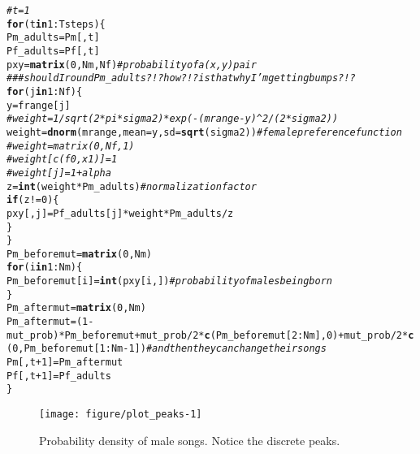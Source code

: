 \documentclass{article}\usepackage[]{graphicx}\usepackage[]{color}
\makeatletter
\def\maxwidth{ %
  \ifdim\Gin@nat@width>\linewidth
    \linewidth
  \else
    \Gin@nat@width
  \fi
}
\newcommand{\hlnum}[1]{\textcolor[rgb]{0.686,0.059,0.569}{#1}}%
\newcommand{\hlcom}[1]{\textcolor[rgb]{0.678,0.584,0.686}{\textit{#1}}}%
\newcommand{\hlopt}[1]{\textcolor[rgb]{0,0,0}{#1}}%
\newcommand{\hlstd}[1]{\textcolor[rgb]{0.345,0.345,0.345}{#1}}%
\newcommand{\hlkwa}[1]{\textcolor[rgb]{0.161,0.373,0.58}{\textbf{#1}}}%
\newcommand{\hlkwb}[1]{\textcolor[rgb]{0.69,0.353,0.396}{#1}}%
\newcommand{\hlkwc}[1]{\textcolor[rgb]{0.333,0.667,0.333}{#1}}%
\newcommand{\hlkwd}[1]{\textcolor[rgb]{0.737,0.353,0.396}{\textbf{#1}}}%
\newenvironment{kframe}{%
 \def\at@end@of@kframe{}%
 \ifinner\ifhmode%
  \def\at@end@of@kframe{\end{minipage}}%
  \begin{minipage}{\columnwidth}%
 \fi\fi%
 \def\FrameCommand##1{\hskip\@totalleftmargin \hskip-\fboxsep
 \colorbox{shadecolor}{##1}\hskip-\fboxsep
     \hskip-\linewidth \hskip-\@totalleftmargin \hskip\columnwidth}%
 \MakeFramed {\advance\hsize-\width
   \@totalleftmargin\z@ \linewidth\hsize
   \@setminipage}}%
 {\par\unskip\endMakeFramed%
 \at@end@of@kframe}
\newenvironment{knitrout}{}{} %
\makeatother
\begin{document}
\begin{knitrout}
\begin{kframe}
\begin{alltt}
\hlcom{# t = 1}
\hlkwa{for}\hlstd{(t} \hlkwa{in} \hlnum{1}\hlopt{:}\hlstd{Tsteps)\{}
        \hlstd{Pm_adults} \hlkwb{=} \hlstd{Pm[,t]}
        \hlstd{Pf_adults} \hlkwb{=} \hlstd{Pf[,t]}
        \hlstd{pxy} \hlkwb{=} \hlkwd{matrix}\hlstd{(}\hlnum{0}\hlstd{,Nm,Nf)} \hlcom{#probability of a (x,y) pair}
        \hlcom{### should I round Pm_adults?!? how?!? is that why I'm getting bumps?!?}
        \hlkwa{for}\hlstd{(j} \hlkwa{in} \hlnum{1}\hlopt{:}\hlstd{Nf)\{}
                \hlstd{y} \hlkwb{=} \hlstd{frange[j]}
                \hlcom{# weight = 1/sqrt(2*pi*sigma2)*exp(-(mrange-y)^2/(2*sigma2))}
                \hlstd{weight} \hlkwb{=} \hlkwd{dnorm}\hlstd{(mrange,}\hlkwc{mean}\hlstd{=y,}\hlkwc{sd}\hlstd{=}\hlkwd{sqrt}\hlstd{(sigma2))} \hlcom{#female preference function}
                \hlcom{# weight = matrix (0,Nf,1)}
                \hlcom{# weight[c(f0,x1)] = 1}
                \hlcom{# weight[j] = 1+alpha}
                \hlstd{z} \hlkwb{=} \hlkwd{int}\hlstd{(weight}\hlopt{*}\hlstd{Pm_adults)} \hlcom{#normalization factor}
                \hlkwa{if}\hlstd{(z}\hlopt{!=}\hlnum{0}\hlstd{)\{}
                        \hlstd{pxy[,j]} \hlkwb{=} \hlstd{Pf_adults[j]}\hlopt{*}\hlstd{weight}\hlopt{*}\hlstd{Pm_adults}\hlopt{/}\hlstd{z}
                        \hlstd{\}}
        \hlstd{\}}
        \hlstd{Pm_beforemut} \hlkwb{=} \hlkwd{matrix}\hlstd{(}\hlnum{0}\hlstd{,Nm)}
        \hlkwa{for}\hlstd{(i} \hlkwa{in} \hlnum{1}\hlopt{:}\hlstd{Nm)\{}
                \hlstd{Pm_beforemut[i]} \hlkwb{=} \hlkwd{int}\hlstd{(pxy[i,])} \hlcom{#probability of males being born}
        \hlstd{\}}
        \hlstd{Pm_aftermut} \hlkwb{=} \hlkwd{matrix}\hlstd{(}\hlnum{0}\hlstd{,Nm)}
        \hlstd{Pm_aftermut} \hlkwb{=} \hlstd{(}\hlnum{1}\hlopt{-}\hlstd{mut_prob)}\hlopt{*}\hlstd{Pm_beforemut} \hlopt{+} \hlstd{mut_prob}\hlopt{/}\hlnum{2}\hlopt{*}\hlkwd{c}\hlstd{(Pm_beforemut[}\hlnum{2}\hlopt{:}\hlstd{Nm],}\hlnum{0}\hlstd{)} \hlopt{+} \hlstd{mut_prob}\hlopt{/}\hlnum{2}\hlopt{*}\hlkwd{c}\hlstd{(}\hlnum{0}\hlstd{,Pm_beforemut[}\hlnum{1}\hlopt{:}\hlstd{Nm}\hlopt{-}\hlnum{1}\hlstd{])} \hlcom{#and then they can change their songs}
        \hlstd{Pm[,t}\hlopt{+}\hlnum{1}\hlstd{]} \hlkwb{=} \hlstd{Pm_aftermut}
        \hlstd{Pf[,t}\hlopt{+}\hlnum{1}\hlstd{]} \hlkwb{=} \hlstd{Pf_adults}
\hlstd{\}}
\end{alltt}
\end{kframe}
\end{knitrout}

\begin{knitrout}
\color{fgcolor}\begin{figure}
\texttt{[image: figure/plot\_peaks-1]} \caption[Probability  density of male songs]{Probability  density of male songs. Notice the discrete peaks. }\label{fig:plot_peaks}
\end{figure}


\end{knitrout}
\end{document}
